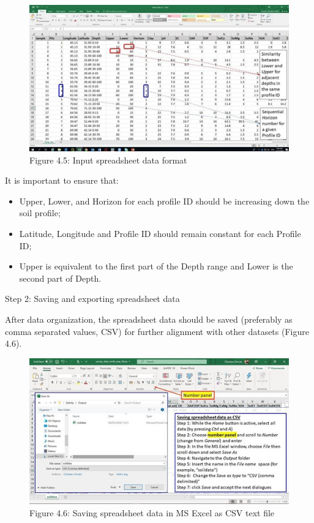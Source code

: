 \documentclass[
  10pt,
  b5paper,
]{book}
\providecommand{\tightlist}{%
  \setlength{\itemsep}{0pt}\setlength{\parskip}{0pt}}
\begin{document}
\begin{figure}
\centering
\includegraphics{figures/images/Figure4.5.jpg}
\caption{Figure 4.5: Input spreadsheet data format}
\end{figure}

It is important to ensure that:

\begin{itemize}
\tightlist
\item
  Upper, Lower, and Horizon for each profile ID should be increasing down the soil profile;\\
\item
  Latitude, Longitude and Profile ID should remain constant for each Profile ID;\\
\item
  Upper is equivalent to the first part of the Depth range and Lower is the second part of Depth.
\end{itemize}

Step 2: Saving and exporting spreadsheet data

After data organization, the spreadsheet data should be saved (preferably as comma separated values, CSV) for further alignment with other datasets (Figure 4.6).

\begin{figure}
\centering
\includegraphics{figures/images/Figure4.6.jpg}
\caption{Figure 4.6: Saving spreadsheet data in MS Excel as CSV text file}
\end{figure}
\end{document}

